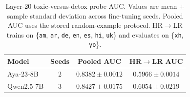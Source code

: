 \begin{table}[t]
\centering
\small
\begin{tabular}{lccc}
\toprule
Model & Seeds & Pooled AUC & HR$\rightarrow$LR AUC \\
\midrule
Aya-23-8B & 2 & $0.8382 \pm 0.0012$ & $0.5966 \pm 0.0014$ \\
Qwen2.5-7B & 3 & $0.8427 \pm 0.0175$ & $0.6054 \pm 0.0219$ \\
\bottomrule
\end{tabular}
\caption{Layer-20 toxic-versus-detox probe AUC. Values are mean $\pm$ sample
standard deviation across fine-tuning seeds. Pooled AUC uses the stored
random-example protocol. HR$\rightarrow$LR trains on
\{\texttt{am}, \texttt{ar}, \texttt{de}, \texttt{en}, \texttt{es}, \texttt{hi},
\texttt{uk}\} and evaluates on \{\texttt{xh}, \texttt{yo}\}.}
\label{tab:probe-main}
\end{table}
